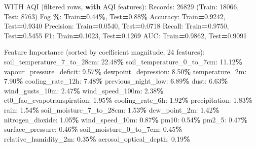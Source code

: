 \documentclass[
  letterpaper,
  DIV=11,
  numbers=noendperiod]{scrartcl}
\newenvironment{Shaded}{\begin{snugshade}}{\end{snugshade}}
\newcommand{\BuiltInTok}[1]{#1}
\newcommand{\ControlFlowTok}[1]{\textcolor[rgb]{0.13,0.29,0.53}{\textbf{#1}}}
\newcommand{\DecValTok}[1]{\textcolor[rgb]{0.00,0.00,0.81}{#1}}
\newcommand{\FloatTok}[1]{\textcolor[rgb]{0.00,0.00,0.81}{#1}}
\newcommand{\NormalTok}[1]{#1}
\newcommand{\OperatorTok}[1]{\textcolor[rgb]{0.81,0.36,0.00}{\textbf{#1}}}
\begin{document}
\begin{Shaded}
\begin{Highlighting}[]
\NormalTok{WITH AQI (filtered rows, }\ControlFlowTok{with}\NormalTok{ AQI features):}
\NormalTok{  Records: }\DecValTok{26829}\NormalTok{ (Train: }\DecValTok{18066}\NormalTok{, Test: }\DecValTok{8763}\NormalTok{)}
\NormalTok{  Fog }\OperatorTok{\%}\NormalTok{: Train}\OperatorTok{=}\FloatTok{0.44}\OperatorTok{\%}\NormalTok{, Test}\OperatorTok{=}\FloatTok{0.88}\OperatorTok{\%}
\NormalTok{  Accuracy: Train}\OperatorTok{=}\FloatTok{0.9242}\NormalTok{, Test}\OperatorTok{=}\FloatTok{0.9340}
\NormalTok{  Precision: Train}\OperatorTok{=}\FloatTok{0.0540}\NormalTok{, Test}\OperatorTok{=}\FloatTok{0.0718}
\NormalTok{  Recall: Train}\OperatorTok{=}\FloatTok{0.9750}\NormalTok{, Test}\OperatorTok{=}\FloatTok{0.5455}
\NormalTok{  F1: Train}\OperatorTok{=}\FloatTok{0.1023}\NormalTok{, Test}\OperatorTok{=}\FloatTok{0.1269}
\NormalTok{  AUC: Train}\OperatorTok{=}\FloatTok{0.9862}\NormalTok{, Test}\OperatorTok{=}\FloatTok{0.9091}

\NormalTok{  Feature Importance (}\BuiltInTok{sorted}\NormalTok{ by coefficient magnitude, }\DecValTok{24}\NormalTok{ features):}
\NormalTok{    soil\_temperature\_7\_to\_28cm: }\FloatTok{22.48}\OperatorTok{\%}
\NormalTok{    soil\_temperature\_0\_to\_7cm: }\FloatTok{11.12}\OperatorTok{\%}
\NormalTok{    vapour\_pressure\_deficit: }\FloatTok{9.57}\OperatorTok{\%}
\NormalTok{    dewpoint\_depression: }\FloatTok{8.50}\OperatorTok{\%}
\NormalTok{    temperature\_2m: }\FloatTok{7.90}\OperatorTok{\%}
\NormalTok{    cooling\_rate\_12h: }\FloatTok{7.48}\OperatorTok{\%}
\NormalTok{    previous\_night\_low: }\FloatTok{6.89}\OperatorTok{\%}
\NormalTok{    dust: }\FloatTok{6.63}\OperatorTok{\%}
\NormalTok{    wind\_gusts\_10m: }\FloatTok{2.47}\OperatorTok{\%}
\NormalTok{    wind\_speed\_100m: }\FloatTok{2.38}\OperatorTok{\%}
\NormalTok{    et0\_fao\_evapotranspiration: }\FloatTok{1.95}\OperatorTok{\%}
\NormalTok{    cooling\_rate\_6h: }\FloatTok{1.92}\OperatorTok{\%}
\NormalTok{    precipitation: }\FloatTok{1.83}\OperatorTok{\%}
\NormalTok{    rain: }\FloatTok{1.54}\OperatorTok{\%}
\NormalTok{    soil\_moisture\_7\_to\_28cm: }\FloatTok{1.53}\OperatorTok{\%}
\NormalTok{    dew\_point\_2m: }\FloatTok{1.42}\OperatorTok{\%}
\NormalTok{    nitrogen\_dioxide: }\FloatTok{1.05}\OperatorTok{\%}
\NormalTok{    wind\_speed\_10m: }\FloatTok{0.87}\OperatorTok{\%}
\NormalTok{    pm10: }\FloatTok{0.54}\OperatorTok{\%}
\NormalTok{    pm2\_5: }\FloatTok{0.47}\OperatorTok{\%}
\NormalTok{    surface\_pressure: }\FloatTok{0.46}\OperatorTok{\%}
\NormalTok{    soil\_moisture\_0\_to\_7cm: }\FloatTok{0.45}\OperatorTok{\%}
\NormalTok{    relative\_humidity\_2m: }\FloatTok{0.35}\OperatorTok{\%}
\NormalTok{    aerosol\_optical\_depth: }\FloatTok{0.19}\OperatorTok{\%}


\end{Highlighting}
\end{Shaded}
\end{document}

